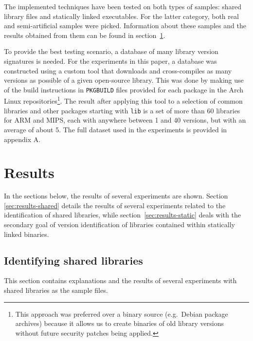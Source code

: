 \documentclass[twocolumn,a4paper]{IEEEtran} %
\begin{document}
The implemented techniques have been tested on both types of samples: shared library files and statically linked executables. For the latter category, both real and semi-artificial samples were picked. Information about these samples and the results obtained from them can be found in section~\ref{sec:results}.

To provide the best testing scenario, a database of many library version signatures is needed. For the experiments in this paper, a database was constructed using a custom tool that downloads and cross-compiles as many versions as possible of a given open-source library. This was done by making use of the build instructions in \texttt{PKGBUILD} files provided for each package in the Arch Linux repositories\footnote{This approach was preferred over a binary source (e.g.\ Debian package archives) because it allows us to create binaries of old library versions without future security patches being applied.}.
The result after applying this tool to a selection of common libraries and other packages starting with \texttt{lib} is a set of more than 60 libraries for ARM and MIPS, each with anywhere between 1 and 40 versions, but with an average of about 5. The full dataset used in the experiments is provided in appendix A.


\section{Results}
\label{sec:results}
In the sections below, the results of several experiments are shown. Section \ref{sec:results-shared} details the results of several experiments related to the identification of shared libraries, while section~\ref{sec:results-static} deals with the secondary goal of version identification of libraries contained within statically linked binaries.
\subsection{Identifying shared libraries}
This section contains explanations and the results of several experiments with shared libraries as the sample files.
\label{sec:results-shared}
\end{document}
